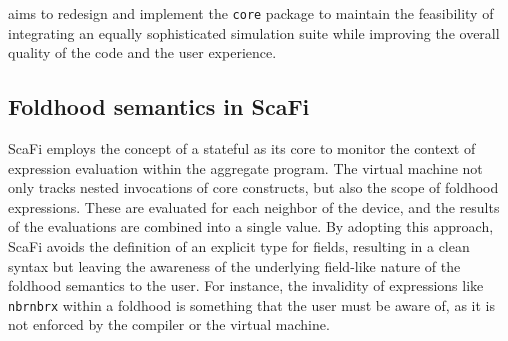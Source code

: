 \this aims to redesign and implement the \texttt{core} package to maintain the feasibility of integrating an equally sophisticated simulation suite while improving the overall quality of the code and the user experience.

\subsection{Foldhood semantics in ScaFi} \label{chap:analysis->sec:scafi-analysis->subsec:foldhood-semantics}

ScaFi employs the concept of a stateful  as its core to monitor the context of expression evaluation within the aggregate program.
%
The virtual machine not only tracks nested invocations of core constructs, but also the scope of foldhood expressions.
%
These are evaluated for each neighbor of the device, and the results of the evaluations are combined into a single value.
%
By adopting this approach, ScaFi avoids the definition of an explicit type for fields, resulting in a clean syntax but leaving the awareness of the underlying field-like nature of the foldhood semantics to the user.
%
For instance, the invalidity of expressions like \texttt{nbr{nbr{x}}} within a foldhood is something that the user must be aware of, as it is not enforced by the compiler or the virtual machine.
